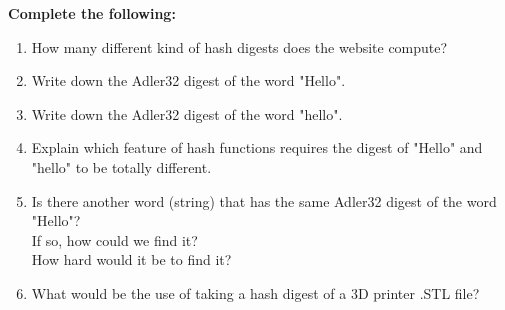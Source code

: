 \documentclass{tufte-handout}
\begin{document}
\textbf{Complete the following:}
\begin{enumerate}
\item{How many different kind of hash digests does the website compute?}\\  
\item{Write down the Adler32 digest of the word "Hello". }\\
\item{Write down the Adler32 digest of the word "hello". }\\
\item{Explain which feature of hash functions requires the digest of "Hello" and "hello" to be totally different.}\\ \vspace{1cm}
\item{Is there another word (string) that has the same Adler32 digest of the word "Hello"?\\ \vspace{2cm}  If so, how could we find it?\\ \vspace{2cm}  How hard would it be to find it?} \\ \vspace{2cm}
\item{What would be the use of taking a hash digest of a 3D printer .STL file?}
\end{enumerate}



%
%
\end{document}
